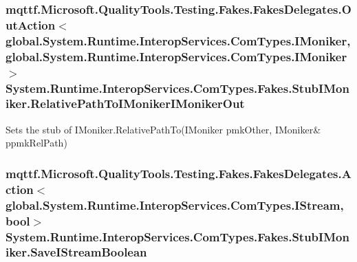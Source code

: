 \hypertarget{class_system_1_1_runtime_1_1_interop_services_1_1_com_types_1_1_fakes_1_1_stub_i_moniker_ac69cc228d5291f6a26628d70c037adeb}{
\subsubsection[{Relative\-Path\-To\-I\-Moniker\-I\-Moniker\-Out}]{\setlength{\rightskip}{0pt plus 5cm}mqttf.\-Microsoft.\-Quality\-Tools.\-Testing.\-Fakes.\-Fakes\-Delegates.\-Out\-Action$<$global.\-System.\-Runtime.\-Interop\-Services.\-Com\-Types.\-I\-Moniker, global.\-System.\-Runtime.\-Interop\-Services.\-Com\-Types.\-I\-Moniker$>$ System.\-Runtime.\-Interop\-Services.\-Com\-Types.\-Fakes.\-Stub\-I\-Moniker.\-Relative\-Path\-To\-I\-Moniker\-I\-Moniker\-Out}}\label{class_system_1_1_runtime_1_1_interop_services_1_1_com_types_1_1_fakes_1_1_stub_i_moniker_ac69cc228d5291f6a26628d70c037adeb}


Sets the stub of I\-Moniker.\-Relative\-Path\-To(I\-Moniker pmk\-Other, I\-Moniker\& ppmk\-Rel\-Path)

\hypertarget{class_system_1_1_runtime_1_1_interop_services_1_1_com_types_1_1_fakes_1_1_stub_i_moniker_a666339be87c22a7b100cfa3934779d3a}{
\subsubsection[{Save\-I\-Stream\-Boolean}]{\setlength{\rightskip}{0pt plus 5cm}mqttf.\-Microsoft.\-Quality\-Tools.\-Testing.\-Fakes.\-Fakes\-Delegates.\-Action$<$global.\-System.\-Runtime.\-Interop\-Services.\-Com\-Types.\-I\-Stream, bool$>$ System.\-Runtime.\-Interop\-Services.\-Com\-Types.\-Fakes.\-Stub\-I\-Moniker.\-Save\-I\-Stream\-Boolean}}\label{class_system_1_1_runtime_1_1_interop_services_1_1_com_types_1_1_fakes_1_1_stub_i_moniker_a666339be87c22a7b100cfa3934779d3a}


